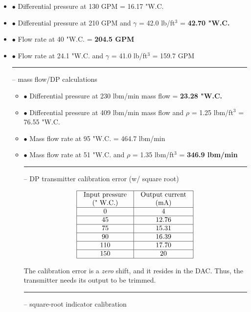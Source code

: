\begin{itemize}
\item{$\bullet$} Differential pressure at 130 GPM = 16.17 "W.C.
\item{$\bullet$} Differential pressure at 210 GPM and $\gamma$ = 42.0 lb/ft$^{3}$ = {\bf 42.70 "W.C.}  
\item{$\bullet$} Flow rate at 40 "W.C. = {\bf 204.5 GPM} 
\item{$\bullet$} Flow rate at 24.1 "W.C. and $\gamma$ = 41.0 lb/ft$^{3}$ = 159.7 GPM 
\medskip


\filbreak \vskip 5pt \hrule \vskip 5pt  -- mass flow/DP calculations \vskip 10pt

\begin{itemize}
\item{$\bullet$} Differential pressure at 230 lbm/min mass flow = {\bf 23.28 "W.C.}
\item{$\bullet$} Differential pressure at 409 lbm/min mass flow and $\rho$ = 1.25 lbm/ft$^{3}$ = 76.55 "W.C.
\item{$\bullet$} Mass flow rate at 95 "W.C. = 464.7 lbm/min 
\item{$\bullet$} Mass flow rate at 51 "W.C. and $\rho$ = 1.35 lbm/ft$^{3}$ = {\bf 346.9 lbm/min} 
\medskip

\filbreak \vskip 5pt \hrule \vskip 5pt  -- DP transmitter calibration error (w/ square root) \vskip 10pt


$$\vbox{\offinterlineskip
\halign{\strut
\vrule \quad\hfil # \ \hfil & 
\vrule \quad\hfil # \ \hfil \vrule \cr
\noalign{\hrule}
%
Input pressure & Output current \cr
(" W.C.) & (mA) \cr
%
\noalign{\hrule}
%
0 & 4 \cr
%
\noalign{\hrule}
%
45 & 12.76 \cr
%
\noalign{\hrule}
%
75 & 15.31 \cr
%
\noalign{\hrule}
%
90 & 16.39 \cr
%
\noalign{\hrule}
%
110 & 17.70 \cr
%
\noalign{\hrule}
%
150 & 20 \cr
%
\noalign{\hrule}
} %
}$$ %

The calibration error is a {\it zero} shift, and it resides in the DAC.  Thus, the transmitter needs its output to be trimmed.


\filbreak \vskip 5pt \hrule \vskip 5pt  -- square-root indicator calibration \vskip 10pt


\end{itemize}
\end{itemize}
